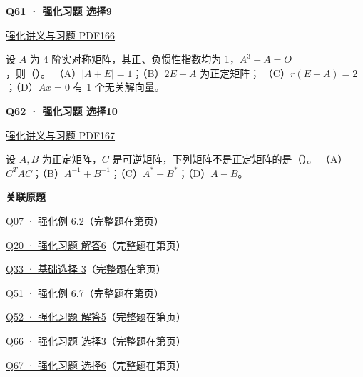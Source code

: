 \documentclass[UTF8,fontset=fandol,11pt,a4paper]{ctexart}
\newcommand{\source}[1]{{\footnotesize\color{Muted}#1\par}}
\newcommand{\qtitle}[2]{\par\needspace{5\baselineskip}\hypertarget{#1}{}\label{#1}\textbf{#2}\par}
\begin{document}
\begin{minipage}{\linewidth}
\qtitle{R-MC-09}{Q61 · 强化习题 选择9}
\source{\href{file:///Users/skyintelligence/Desktop/\%E5\%BE\%97\%E8\%AF\%BB\%E4\%B8\%AA\%E7\%A0\%94-\%E5\%8C\%97\%E5\%A4\%A7\%E8\%BD\%AF\%E5\%BE\%AE/\%E6\%95\%B0\%E5\%AD\%A6\%20150/Kira\%C2\%B727\%E7\%BA\%BF\%E6\%80\%A7\%E4\%BB\%A3\%E6\%95\%B0\%E5\%BC\%BA\%E5\%8C\%96\%E8\%AE\%B2\%E4\%B9\%89\%2B\%E4\%B9\%A0\%E9\%A2\%98.pdf\#page=166}{强化讲义与习题 PDF166}}
设 $A$ 为 4 阶实对称矩阵，其正、负惯性指数均为 1，$A^3-A=O$，则（\quad）。
（A）$|A+E|=1$；（B）$2E+A$ 为正定矩阵；
（C）$r(E-A)=2$；（D）$Ax=0$ 有 1 个无关解向量。
\end{minipage}\par\vspace{7mm}
\begin{minipage}{\linewidth}
\qtitle{R-MC-10}{Q62 · 强化习题 选择10}
\source{\href{file:///Users/skyintelligence/Desktop/\%E5\%BE\%97\%E8\%AF\%BB\%E4\%B8\%AA\%E7\%A0\%94-\%E5\%8C\%97\%E5\%A4\%A7\%E8\%BD\%AF\%E5\%BE\%AE/\%E6\%95\%B0\%E5\%AD\%A6\%20150/Kira\%C2\%B727\%E7\%BA\%BF\%E6\%80\%A7\%E4\%BB\%A3\%E6\%95\%B0\%E5\%BC\%BA\%E5\%8C\%96\%E8\%AE\%B2\%E4\%B9\%89\%2B\%E4\%B9\%A0\%E9\%A2\%98.pdf\#page=167}{强化讲义与习题 PDF167}}
设 $A,B$ 为正定矩阵，$C$ 是可逆矩阵，下列矩阵不是正定矩阵的是（\quad）。
（A）$C^TAC$；（B）$A^{-1}+B^{-1}$；（C）$A^*+B^*$；（D）$A-B$。
\end{minipage}\par\vspace{7mm}
\textbf{关联原题}\par
\hyperlink{R-EX-02}{Q07 · 强化例 6.2}（完整题在第\pageref*{R-EX-02}页）\par
\hyperlink{R-LONG-06}{Q20 · 强化习题 解答6}（完整题在第\pageref*{R-LONG-06}页）\par
\hyperlink{B-MC-03}{Q33 · 基础选择 3}（完整题在第\pageref*{B-MC-03}页）\par
\hyperlink{R-EX-07}{Q51 · 强化例 6.7}（完整题在第\pageref*{R-EX-07}页）\par
\hyperlink{R-LONG-05}{Q52 · 强化习题 解答5}（完整题在第\pageref*{R-LONG-05}页）\par
\hyperlink{R-MC-03}{Q66 · 强化习题 选择3}（完整题在第\pageref*{R-MC-03}页）\par
\hyperlink{R-MC-06}{Q67 · 强化习题 选择6}（完整题在第\pageref*{R-MC-06}页）\par
\clearpage
\end{document}
